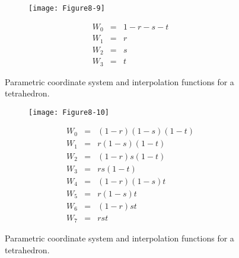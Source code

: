\begin{figure}[!htb]
	\centering
	\begin{subfigure}{0.48\linewidth}
		\centering
		\texttt{[image: Figure8-9]}
		\caption*{}
	\end{subfigure}
	\hfill
	\begin{subfigure}{0.48\linewidth}
		\centering
		\begin{equation*}
		\begin{array}{lll}
		W_0 &=& 1 - r - s - t \\
		W_1 &=& r \\
		W_2 &=& s \\
		W_3 &=& t	
		\end{array}
		\end{equation*}
	\end{subfigure}%
	\caption{Parametric coordinate system and interpolation functions for a tetrahedron.}
	\label{fig:Figure8-9}
\end{figure}

\begin{figure}[!htb]
	\centering
	\begin{subfigure}{0.48\linewidth}
		\centering
		\texttt{[image: Figure8-10]}
		\caption*{}
	\end{subfigure}
	\hfill
	\begin{subfigure}{0.48\linewidth}
		\centering
		\begin{equation*}
		\begin{array}{lll}
		W_0 &=& (1 - r)(1 - s)(1 - t) \\
		W_1 &=& r (1-s)(1 -t) \\
		W_2 &=& (1-r)s(1-t) \\
		W_3 &=& rs(1 - t) \\
		W_4 &=& (1 - r)(1 - s) t \\
		W_5 &=& r (1-s)t \\
		W_6 &=& (1 - r)s t \\
		W_7 &=& r s t	
		\end{array}
		\end{equation*}
	\end{subfigure}%
	\caption{Parametric coordinate system and interpolation functions for a tetrahedron.}
	\label{fig:Figure8-10}
\end{figure}

